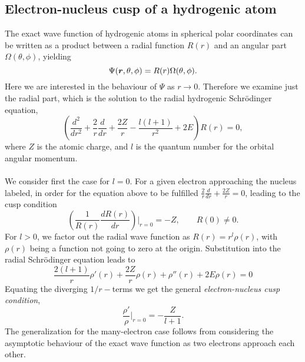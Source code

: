 \subsection{Electron-nucleus cusp of a hydrogenic atom}\label{electronNucleusCusp}
The exact wave function of hydrogenic atoms in spherical polar coordinates can be written as a product between a radial function $R(r)$ and an angular part $\Omega(\theta,\phi)$, yielding
$$\Psi(\boldsymbol{r}, \theta, \phi) = R(r) \Omega(\theta, \phi).$$ Here we are interested in the behaviour of $\Psi$ as $r \rightarrow 0$. Therefore we examine just the radial part, which is the solution to the radial hydrogenic Schr\"odinger equation,
\begin{equation}\label{radialSE}
 \left(\frac{d^2}{dr^2} + \frac{2}{r} \frac{d}{dr} + \frac{2Z}{r} - \frac{l(l+1)}{r^2} + 2E \right) R(r) = 0,
\end{equation}
where $Z$ is the atomic charge, and $l$ is the quantum number for the orbital angular momentum. \\
\\
\noindent
We consider first the case for $l=0$.
For a given electron approaching the nucleus labeled, in order for the equation above 
to be fulfilled $\frac{2}{r} \frac{d}{dr} + \frac{2Z}{r} = 0$, leading to the cusp condition
\begin{equation}\label{enCups}
\boxed{\left(\frac{1}{R(r)}\frac{dR(r)}{dr}\right)\Big|_{r=0} = -Z, \qquad R(0) \neq 0.}
\end{equation}
For $l>0$, we factor out the radial wave function as $R(r) = r^l \rho(r)$, with $\rho(r)$ being a function not going to zero at the origin. Substitution into the radial Schr\"odinger equation leads to 
$$
\frac{2(l+1)}{r}\rho'(r) + \frac{2Z}{r} \rho(r) + \rho''(r) + 2E \rho(r) = 0
$$
Equating the diverging $1/r-$terms we get the general \emph{electron-nucleus cusp condition},
\begin{equation}\label{enCups2}
\boxed{\frac{\rho'}{\rho}\Big|_{r=0} = -\frac{Z}{l+1}.}
\end{equation}
The generalization for the many-electron case follows from considering the asymptotic behaviour of the exact wave function as two electrons approach each other.


